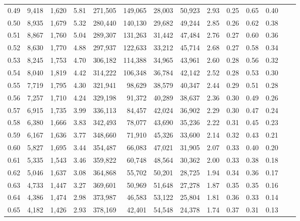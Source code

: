\begin{tabular}{rrrrrrrrrrrrrr}
0.49 &   9,418 &  1,620 &    5.81 &  271,505 &  149,065 &  28,003 &  50,923 &  2.93 &  0.25 &  0.65 &      0.40 \\
0.50 &   8,935 &  1,679 &    5.32 &  280,440 &  140,130 &  29,682 &  49,244 &  2.85 &  0.26 &  0.62 &      0.38 \\
0.51 &   8,867 &  1,760 &    5.04 &  289,307 &  131,263 &  31,442 &  47,484 &  2.76 &  0.27 &  0.60 &      0.36 \\
0.52 &   8,630 &  1,770 &    4.88 &  297,937 &  122,633 &  33,212 &  45,714 &  2.68 &  0.27 &  0.58 &      0.34 \\
0.53 &   8,245 &  1,753 &    4.70 &  306,182 &  114,388 &  34,965 &  43,961 &  2.60 &  0.28 &  0.56 &      0.32 \\
0.54 &   8,040 &  1,819 &    4.42 &  314,222 &  106,348 &  36,784 &  42,142 &  2.52 &  0.28 &  0.53 &      0.30 \\
0.55 &   7,719 &  1,795 &    4.30 &  321,941 &   98,629 &  38,579 &  40,347 &  2.44 &  0.29 &  0.51 &      0.28 \\
0.56 &   7,257 &  1,710 &    4.24 &  329,198 &   91,372 &  40,289 &  38,637 &  2.36 &  0.30 &  0.49 &      0.26 \\
0.57 &   6,915 &  1,735 &    3.99 &  336,113 &   84,457 &  42,024 &  36,902 &  2.29 &  0.30 &  0.47 &      0.24 \\
0.58 &   6,380 &  1,666 &    3.83 &  342,493 &   78,077 &  43,690 &  35,236 &  2.22 &  0.31 &  0.45 &      0.23 \\
0.59 &   6,167 &  1,636 &    3.77 &  348,660 &   71,910 &  45,326 &  33,600 &  2.14 &  0.32 &  0.43 &      0.21 \\
0.60 &   5,827 &  1,695 &    3.44 &  354,487 &   66,083 &  47,021 &  31,905 &  2.07 &  0.33 &  0.40 &      0.20 \\
0.61 &   5,335 &  1,543 &    3.46 &  359,822 &   60,748 &  48,564 &  30,362 &  2.00 &  0.33 &  0.38 &      0.18 \\
0.62 &   5,046 &  1,637 &    3.08 &  364,868 &   55,702 &  50,201 &  28,725 &  1.94 &  0.34 &  0.36 &      0.17 \\
0.63 &   4,733 &  1,447 &    3.27 &  369,601 &   50,969 &  51,648 &  27,278 &  1.87 &  0.35 &  0.35 &      0.16 \\
0.64 &   4,386 &  1,474 &    2.98 &  373,987 &   46,583 &  53,122 &  25,804 &  1.81 &  0.36 &  0.33 &      0.14 \\
0.65 &   4,182 &  1,426 &    2.93 &  378,169 &   42,401 &  54,548 &  24,378 &  1.74 &  0.37 &  0.31 &      0.13 \\

\end{tabular}
